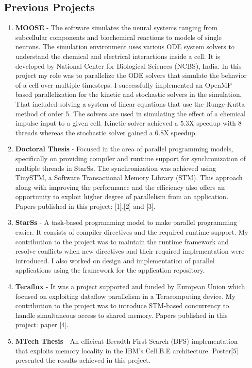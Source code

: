 \documentclass[margin]{res}
\begin{document}
\begin{resume}
\section{Previous Projects}
\begin{enumerate}
	   \item {\bf MOOSE } -
			 The software simulates the neural systems ranging from subcellular components and biochemical reactions to models of single neurons. The simulation environment uses various ODE system solvers to understand the chemical and electrical interactions inside a cell.
			 It is developed by National Center for Biological Sciences (NCBS), India.
       In this project my role was to parallelize the ODE solvers that simulate the behavior of a cell over multiple timesteps.
       I successfully implemented an OpenMP based parallelization for the kinetic and stochastic solvers in the simulation.
       That included solving a system of linear equations that use the Runge-Kutta method of order 5.
       The solvers are used in simulating the effect of a chemical impulse input to a given cell.
			 Kinetic solver achieved a 5.3X speedup with 8 threads whereas the stochastic solver gained a 6.8X speedup.
%
	   \item {\bf Doctoral Thesis} -
			 Focused in the area of parallel programming models, specifically on providing compiler and runtime support for synchronization of multiple threads in StarSs.
			 The synchronization was achieved using TinySTM, a Software Transactional Memory Library (STM).
			 This approach along with improving the performance and the efficiency also offers an opportunity to exploit higher degree of parallelism from an application.
			 Papers published in this project: [1],[2] and [3].
%
	   \item {\bf StarSs} -
			 A task-based programming model to make parallel programming easier. It consists of compiler directives and the required runtime support.
			 My contribution to the project was to maintain the runtime framework and resolve conflicts when new directives and their required implementation were introduced.
			 I also worked on design and implementation of parallel applications using the framework for the application repository.
%
	   \item {\bf Teraflux} -
			 It was a project supported and funded by European Union which focused on exploiting dataflow parallelism in a Teracomputing device.
 	    		My contribution to the project was to introduce STM-based concurrency to handle simultaneous access to shared memory.
	     	Papers published in this project: paper [4].
%
	   \item {\bf MTech Thesis} -
		An efficient Breadth First Search (BFS) implementation that exploits memory locality in the IBM's Cell.B.E architecture.
		Poster[5] presented the results achieved in this project.
%
\end{enumerate}
%

\end{resume}
\end{document}
